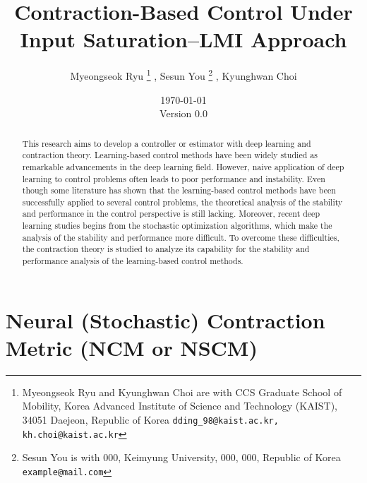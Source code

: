 \documentclass{article}
\title{
    Contraction-Based Control Under Input Saturation–LMI Approach
}
\author{
    Myeongseok Ryu
    \thanks{
        Myeongseok Ryu and Kyunghwan Choi are with CCS Graduate School of Mobility, Korea Advanced Institute of Science and Technology (KAIST), 34051 Daejeon, Republic of Korea {\tt\small dding\_98@kaist.ac.kr, kh.choi@kaist.ac.kr}}%
    , 
    Sesun You
    \thanks{Sesun You is with 000, Keimyung University, 000, 000, Republic of Korea {\tt\small example@mail.com}}%
    ,
    Kyunghwan Choi
    \footnotemark[1]
}
\date{
    \today
    \\
    Version 0.0
}
\newcommand*{\template}{../template}
\begin{document}
\maketitle

\begin{abstract}
    This research aims to develop a controller or estimator with deep learning and contraction theory.
    Learning-based control methods have been widely studied as remarkable advancements in the deep learning field.
    However, naive application of deep learning to control problems often leads to poor performance and instability.
    Even though some literature has shown that the learning-based control methods have been successfully applied to several control problems, the theoretical analysis of the stability and performance in the control perspective is still lacking.
    Moreover, recent deep learning studies begins from the stochastic optimization algorithms, which make the analysis of the stability and performance more difficult.
    To overcome these difficulties, the contraction theory is studied to analyze its capability for the stability and performance analysis of the learning-based control methods.
\end{abstract}

\tableofcontents









\section{Neural (Stochastic) Contraction Metric (NCM or NSCM)}



\begin{appendices}
\end{appendices}




\end{document}
